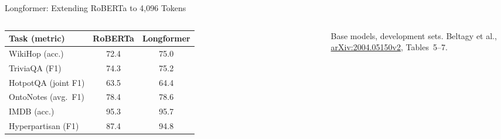 \begin{frame}{Longformer: Extending RoBERTa to 4,096 Tokens}
\begin{columns}[T,onlytextwidth]
      \vspace{0.8em}
      {\scriptsize\setlength{\tabcolsep}{4pt}
      \begin{tabular}{lcc}
        \toprule
        \textbf{Task (metric)} & \textbf{RoBERTa} & \textbf{Longformer} \\
        \midrule
        WikiHop (acc.) & 72.4 & 75.0 \\
        TriviaQA (F1) & 74.3 & 75.2 \\
        HotpotQA (joint F1) & 63.5 & 64.4 \\
        OntoNotes (avg.\ F1) & 78.4 & 78.6 \\
        IMDB (acc.) & 95.3 & 95.7 \\
        Hyperpartisan (F1) & 87.4 & 94.8 \\
        \bottomrule
      \end{tabular}\par}
      \vspace{0.3em}
      {\scriptsize Base models, development sets. Beltagy et al., \href{https://arxiv.org/abs/2004.05150v2}{arXiv:2004.05150v2}, Tables~5--7.\par}
  \end{columns}
\end{frame}

